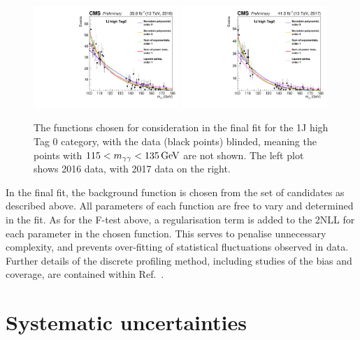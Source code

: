 \begin{figure}[hptb]
  \centering
  \includegraphics[width=0.49\textwidth]{Figures/SigBkg/allPdfs_RECO_1J_PTH_120_200_Tag0_2016.pdf}
  \includegraphics[width=0.49\textwidth]{Figures/SigBkg/allPdfs_RECO_1J_PTH_120_200_Tag0_2017.pdf}
  \caption[Candidate background functions considered for the 1J high Tag 0 category.]
  {
    The functions chosen for consideration in the final fit for the 1J high Tag 0 category, 
    with the data (black points) blinded, 
    meaning the points with $115 < m_{\gamma\gamma} < \SI{135}{GeV}$ are not shown.
    The left plot shows 2016 data, with 2017 data on the right.
  }
  \label{fig:sigbkg_functions}
\end{figure}

In the final fit, the background function is chosen from the set of candidates as described above.
All parameters of each function are free to vary and determined in the fit.
As for the F-test above, 
a regularisation term is added to the 2NLL for each parameter in the chosen function.
This serves to penalise unnecessary complexity, 
and prevents over-fitting of statistical fluctuations observed in data. %
Further details of the discrete profiling method, 
including studies of the bias and coverage,
are contained within Ref.~\cite{Envelope}.

\section{Systematic uncertainties}

